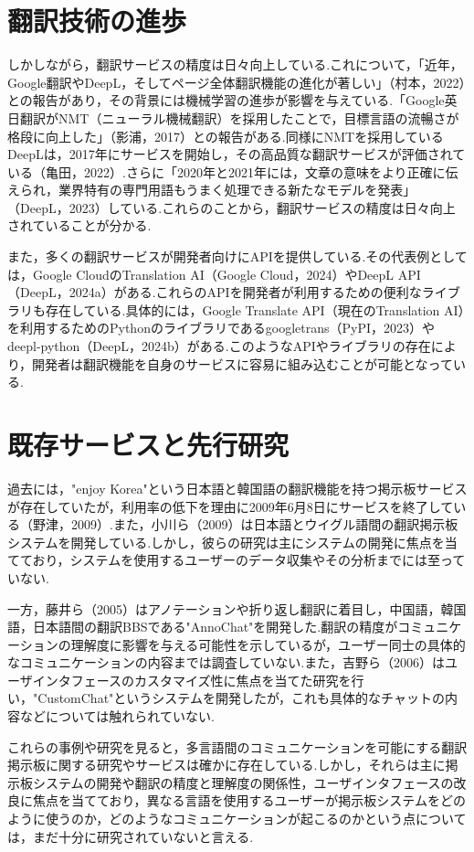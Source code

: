 \documentclass[b5paper,12pt,dvipdfmx]{jsreport}
\begin{document}
\section{翻訳技術の進歩}

しかしながら，翻訳サービスの精度は日々向上している.これについて，「近年，Google翻訳やDeepL，そしてページ全体翻訳機能の進化が著しい」（村本，2022）との報告があり，その背景には機械学習の進歩が影響を与えている.「Google英日翻訳がNMT（ニューラル機械翻訳）を採用したことで，目標言語の流暢さが格段に向上した」（影浦，2017）との報告がある.同様にNMTを採用しているDeepLは，2017年にサービスを開始し，その高品質な翻訳サービスが評価されている（亀田，2022）.さらに「2020年と2021年には，文章の意味をより正確に伝えられ，業界特有の専門用語もうまく処理できる新たなモデルを発表」（DeepL，2023）している.これらのことから，翻訳サービスの精度は日々向上されていることが分かる.

また，多くの翻訳サービスが開発者向けにAPIを提供している.その代表例としては，Google CloudのTranslation AI（Google Cloud，2024）やDeepL API（DeepL，2024a）がある.これらのAPIを開発者が利用するための便利なライブラリも存在している.具体的には，Google Translate API（現在のTranslation AI）を利用するためのPythonのライブラリであるgoogletrans（PyPI，2023）やdeepl-python（DeepL，2024b）がある.このようなAPIやライブラリの存在により，開発者は翻訳機能を自身のサービスに容易に組み込むことが可能となっている.

\section{既存サービスと先行研究}

過去には，"enjoy Korea"という日本語と韓国語の翻訳機能を持つ掲示板サービスが存在していたが，利用率の低下を理由に2009年6月8日にサービスを終了している（野津，2009）.また，小川ら（2009）は日本語とウイグル語間の翻訳掲示板システムを開発している.しかし，彼らの研究は主にシステムの開発に焦点を当てており，システムを使用するユーザーのデータ収集やその分析までには至っていない.

一方，藤井ら（2005）はアノテーションや折り返し翻訳に着目し，中国語，韓国語，日本語間の翻訳BBSである"AnnoChat"を開発した.翻訳の精度がコミュニケーションの理解度に影響を与える可能性を示しているが，ユーザー同士の具体的なコミュニケーションの内容までは調査していない.また，吉野ら（2006）はユーザインタフェースのカスタマイズ性に焦点を当てた研究を行い，"CustomChat"というシステムを開発したが，これも具体的なチャットの内容などについては触れられていない.

これらの事例や研究を見ると，多言語間のコミュニケーションを可能にする翻訳掲示板に関する研究やサービスは確かに存在している.しかし，それらは主に掲示板システムの開発や翻訳の精度と理解度の関係性，ユーザインタフェースの改良に焦点を当てており，異なる言語を使用するユーザーが掲示板システムをどのように使うのか，どのようなコミュニケーションが起こるのかという点については，まだ十分に研究されていないと言える.
\end{document}
